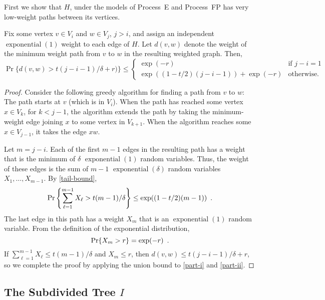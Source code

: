 \documentclass[lotsofwhite]{patmorin}
\DeclareMathOperator{\exponential}{exponential}
\begin{document}
First we show that $H$, under the models of Process~E and Process~FP
has very low-weight paths between its vertices.

\begin{lem}
   Fix some vertex $v\in V_i$ and $w\in V_j$, $j>i$, and assign an
   independent $\exponential(1)$ weight to each edge of $H$.  Let $d(v,w)$
   denote the weight of the minimum weight path from $v$ to $w$ in the
   resulting weighted graph.  Then,
   \[
       \Pr\{d(v,w) > t(j-i-1)/\delta + r) \} \le
       \begin{cases}
           \exp(-r) & \text{if $j-i=1$} \\
           \exp((1-t/2)(j-i-1)) + \exp(-r) & \text{otherwise.}
       \end{cases}
   \]
\end{lem}

\begin{proof}
   Consider the following greedy algorithm for finding a path from $v$
   to $w$: The path starts at $v$ (which is in $V_i$).  When the path
   has reached some vertex $x\in V_{k}$, for $k<j-1$, the algorithm
   extends the path by taking the minimum-weight edge joining $x$ to some
   vertex in $V_{k+1}$.  When the algorithm reaches some $x\in V_{j-1}$,
   it takes the edge $xw$.

   Let $m=j-i$.  Each of the first $m-1$ edges in the resulting path
   has a weight that is the minimum of $\delta$ $\exponential(1)$
   random variables.  Thus, the weight of these edges is the sum of
   $m-1$ $\exponential(\delta)$ random variables $X_1,\ldots,X_{m-1}$.
   By \eqref{tail-bound},
   \begin{equation}
     \Pr\left\{\sum_{\ell=1}^{m-1} X_\ell > t(m-1)/\delta \right\} \le 
        \exp((1-t/2)(m-1)) \enspace .  \eqlabel{part-i}
   \end{equation}
   The last edge in this path has a weight $X_m$ that is an
   $\exponential(1)$ random variable.  From the definition
   of the exponential distribution,
   \begin{equation}
      \Pr\{X_m > r\} = \exp(-r) \enspace . \eqlabel{part-ii}
   \end{equation}
   If $\sum_{\ell=1}^{m-1} X_\ell \le t(m-1)/\delta$ and $X_m \le r$, then
   $d(v,w)\le t(j-i-1)/\delta + r$, so we complete the proof by 
   applying the union bound to \eqref{part-i} and \eqref{part-ii}.
\end{proof}

\subsection{The Subdivided Tree $I$}
\end{document}
